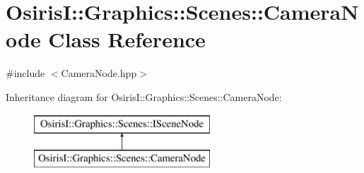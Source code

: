 \hypertarget{class_osiris_i_1_1_graphics_1_1_scenes_1_1_camera_node}{\section{Osiris\-I\-:\-:Graphics\-:\-:Scenes\-:\-:Camera\-Node Class Reference}
\label{class_osiris_i_1_1_graphics_1_1_scenes_1_1_camera_node}
}


{\ttfamily \#include $<$Camera\-Node.\-hpp$>$}

Inheritance diagram for Osiris\-I\-:\-:Graphics\-:\-:Scenes\-:\-:Camera\-Node\-:\begin{figure}[H]
\begin{center}
\leavevmode
\includegraphics[height=2.000000cm]{class_osiris_i_1_1_graphics_1_1_scenes_1_1_camera_node}
\end{center}
\end{figure}
